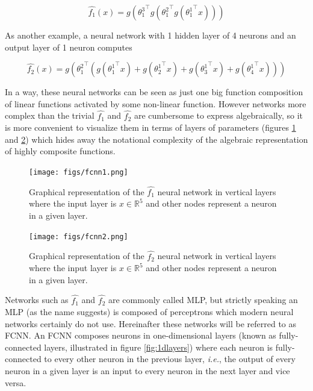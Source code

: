 \begin{equation}
\hat{f_1}(x) = g({\theta^3_1}^{\top} g({\theta^2_1}^{\top} g({\theta^1_1}^{\top} x)))
\end{equation}


As another example, a neural network with 1 hidden layer of 4 neurons and an output layer of 1 neuron computes

\begin{equation}
\hat{f_2}(x) = g({\theta^2_1}^{\top} (g({\theta^1_1}^{\top} x) + g({\theta^1_2}^{\top} x) + g({\theta^1_3}^{\top} x) + g({\theta^1_4}^{\top} x)))
\end{equation}

In a way, these neural networks can be seen as just one big function composition of linear functions activated by some non-linear function. However networks more complex than the trivial $\hat{f_1}$ and $\hat{f_2}$ are cumbersome to express algebraically, so it is more convenient to visualize them in terms of layers of parameters (figures \ref{fig:fcnn1} and \ref{fig:fcnn2}) which hides away the notational complexity of the algebraic representation of highly composite functions.

\begin{figure}[ht]
    \centering
    \texttt{[image: figs/fcnn1.png]}
    \caption{Graphical representation of the $\hat{f_1}$ neural network in vertical layers where the input layer is $x \in \mathbb{R}^{5}$ and other nodes represent a neuron in a given layer.}
    \label{fig:fcnn1}
\end{figure}

\begin{figure}[ht]
    \centering
    \texttt{[image: figs/fcnn2.png]}
    \caption{Graphical representation of the $\hat{f_2}$ neural network in vertical layers where the input layer is $x \in \mathbb{R}^{5}$ and other nodes represent a neuron in a given layer.}
    \label{fig:fcnn2}
\end{figure}

Networks such as $\hat{f_1}$ and $\hat{f_2}$ are commonly called \ac{MLP}, but strictly speaking an \ac{MLP} (as the name suggests) is composed of perceptrons which modern neural networks certainly do not use. Hereinafter these networks will be referred to as \ac{FCNN}. An \ac{FCNN} composes neurons in one-dimensional layers (known as fully-connected layers, illustrated in figure \ref{fig:1dlayers}) where each neuron is fully-connected to every other neuron in the previous layer, \textit{i.e.}, the output of every neuron in a given layer is an input to every neuron in the next layer and vice versa.

